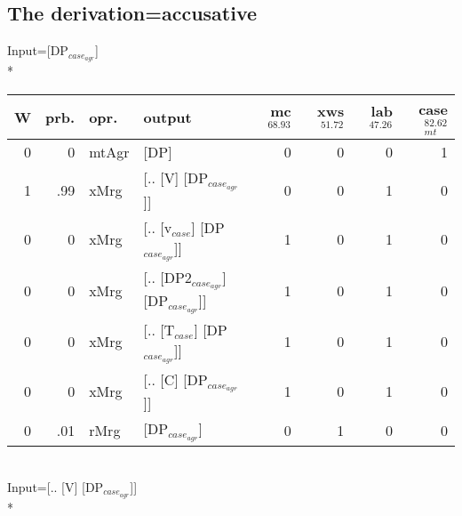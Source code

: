 \subsection{The derivation=accusative}
\begingroup\scriptsize Input=[DP$_{case_{agr}}$]\\*
\begin{tabularx}{\linewidth}{rrlXrrrr}
\hline
   W &   prb. & opr.    & output                            &   mc$^{68.93}$ &   xws$^{51.72}$ &   lab$^{47.26}$ &   case$_{mt}^{82.62}$ \\
\hline
   0 &   0 & mtAgr & [DP]                              &            0 &             0 &             0 &                 1 \\
   1 &   .99 & xMrg  & [.. [V] [DP$_{case_{agr}}$]]            &            0 &             0 &             1 &                 0 \\
   0 &   0 & xMrg  & [.. [v$_{case}$] [DP$_{case_{agr}}$]]       &            1 &             0 &             1 &                 0 \\
   0 &   0 & xMrg  & [.. [DP2$_{case_{agr}}$] [DP$_{case_{agr}}$]] &            1 &             0 &             1 &                 0 \\
   0 &   0 & xMrg  & [.. [T$_{case}$] [DP$_{case_{agr}}$]]       &            1 &             0 &             1 &                 0 \\
   0 &   0 & xMrg  & [.. [C] [DP$_{case_{agr}}$]]            &            1 &             0 &             1 &                 0 \\
   0 &   .01 & rMrg  & [DP$_{case_{agr}}$]                     &            0 &             1 &             0 &                 0 \\
\hline
\end{tabularx}\endgroup\\
\begingroup\scriptsize Input=[.. [V] [DP$_{case_{agr}}$]]\\*
